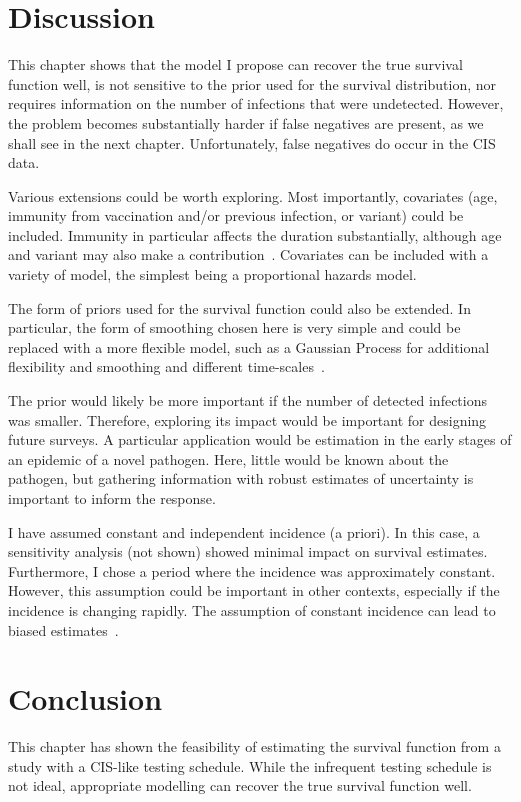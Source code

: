\documentclass[thesis.tex]{subfiles}
\begin{document}
\section{Discussion} \label{perf-test:sec:discussion}

This chapter shows that the model I propose can recover the true survival function well, is not sensitive to the prior used for the survival distribution, nor requires information on the number of infections that were undetected.
However, the problem becomes substantially harder if false negatives are present, as we shall see in the next chapter.
Unfortunately, false negatives do occur in the CIS data.

Various extensions could be worth exploring.
Most importantly, covariates (\eg age, immunity from vaccination and/or previous infection, or variant) could be included.
Immunity in particular affects the duration substantially, although age and variant may also make a contribution~\autocites{hakkiOnset}{russellWithinhost}.
Covariates can be included with a variety of model, the simplest being a proportional hazards model.

The form of priors used for the survival function could also be extended.
In particular, the form of smoothing chosen here is very simple and could be replaced with a more flexible model, such as a Gaussian Process for additional flexibility and smoothing and different time-scales~\autocite{saulGaussian}.

The prior would likely be more important if the number of detected infections was smaller.
Therefore, exploring its impact would be important for designing future surveys.
A particular application would be estimation in the early stages of an epidemic of a novel pathogen.
Here, little would be known about the pathogen, but gathering information with robust estimates of uncertainty is important to inform the response.

I have assumed constant and independent incidence (a priori).
In this case, a sensitivity analysis (not shown) showed minimal impact on survival estimates.
Furthermore, I chose a period where the incidence was approximately constant.
However, this assumption could be important in other contexts, especially if the incidence is changing rapidly.
The assumption of constant incidence can lead to biased estimates~\autocite{degruttolaAnalysis}.

\section{Conclusion} \label{perf-test:sec:conclusion}
This chapter has shown the feasibility of estimating the survival function from a study with a CIS-like testing schedule.
While the infrequent testing schedule is not ideal, appropriate modelling can recover the true survival function well.

\ifSubfilesClassLoaded{
  \appendix
  
  \listoftodos
}{}
\end{document}
